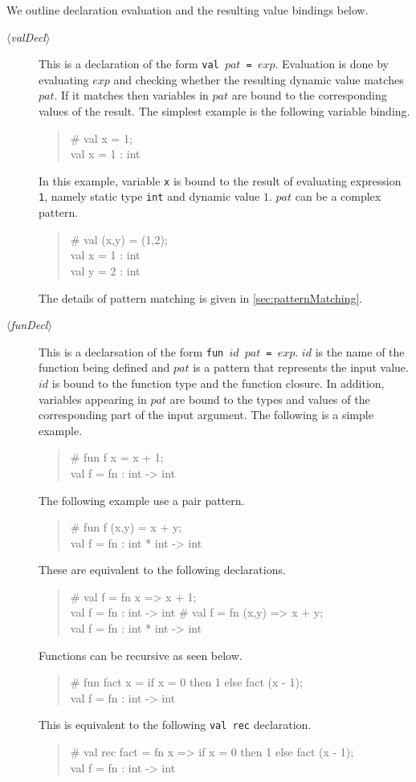 \documentclass{jbook}
\newcommand{\code}[1]{\mbox{\large\tt #1}}
\newcommand{\nonterm}[1]{\mbox{$\langle$}{\it #1}\mbox{$\rangle$}}
\newenvironment{program}{\begin{quote}\begin{tt}}%
                        {\end{tt}\end{quote}}
\begin{document}
	We outline declaration evaluation and the resulting value
bindings below.
\begin{description}
\item[\nonterm{valDecl}] 
	This is a declaration of the form \code{val $pat$ = $exp$}.
	Evaluation is done by evaluating $exp$ and checking whether the
resulting dynamic value matches $pat$.
	If it matches then variables in $pat$ are bound to the
corresponding values of the result.
	The simplest example is the following variable binding.
\begin{program}
  \# val x = 1;\\
  val x = 1 : int
\end{program}
	In this example, variable \code{x} is bound to the result of
evaluating expression \code{1}, namely static type \code{int} and
dynamic value $1$.
	$pat$ can be a complex pattern.
\begin{program}
  \# val (x,y) = (1,2);\\
  val x = 1 : int\\
  val y = 2 : int
\end{program}
	The details of pattern matching is given in \ref{sec:patternMatching}.

\item[\nonterm{funDecl}] 
	This is a declarsation of the form \code{fun $id$ $pat$ = $exp$}.
	$id$ is the name of the function being defined and
$pat$ is a pattern that represents the input value.
	$id$ is bound to the function type and the function closure.
	In addition, variables appearing in $pat$ are bound to
the types and values of the corresponding part of the input argument.
	The following is a simple example.
\begin{program}
  \# fun f x = x + 1;\\
  val f = fn : int -> int
\end{program}
	The following example use a pair pattern.
\begin{program}
  \# fun f (x,y) = x + y;\\
  val f = fn : int * int -> int
\end{program}
	These are equivalent to the following declarations.
\begin{program}
  \# val f = fn x => x + 1;\\
  val f = fn : int -> int
  \# val f = fn (x,y) => x + y;\\
  val f = fn : int * int -> int
\end{program}
	Functions can be recursive as seen below.
\begin{program}
  \# fun fact x = if x = 0 then 1 else fact (x - 1);\\
  val f = fn : int -> int
\end{program}
	This is equivalent to the following {\tt val rec} declaration.
\begin{program}
  \# val rec fact = fn x => if x = 0 then 1 else fact (x - 1);\\
  val f = fn : int -> int
\end{program}


\end{description}
\end{document}
